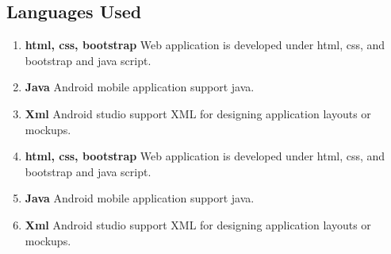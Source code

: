 \subsection{Languages Used}
\begin{enumerate}
\item \textbf{html, css, bootstrap }
      Web application is developed under html, css, and bootstrap and java script.
\item \textbf{Java}
      Android mobile application support java.
\item \textbf{Xml}
     Android studio support XML for designing application layouts or mockups.
\item \textbf{html, css, bootstrap }
      Web application is developed under html, css, and bootstrap and java script.
\item \textbf{Java}
      Android mobile application support java.
\item \textbf{Xml}
     Android studio support XML for designing application layouts or mockups.
\end{enumerate}

